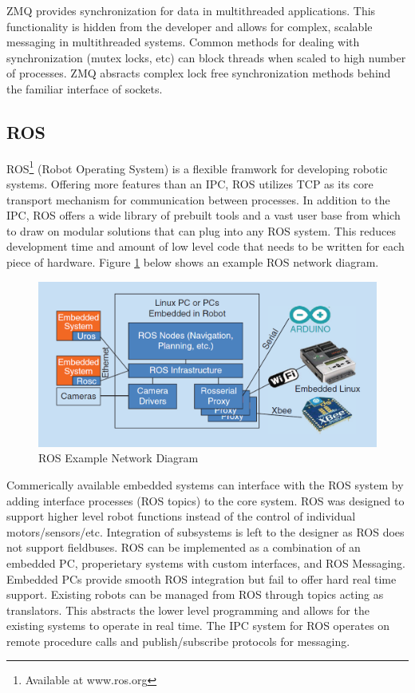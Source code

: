 ZMQ provides synchronization for data in multithreaded applications. This functionality is hidden from the developer and allows for complex, scalable messaging in multithreaded systems. Common methods for dealing with synchronization (mutex locks, etc) can block threads when scaled to high number of processes. ZMQ absracts complex lock free synchronization methods behind the familiar interface of sockets\cite{MULTITHREADZMQ}.

\subsection{ROS}

ROS\footnote{Available at www.ros.org} (Robot Operating System) is a flexible framwork for developing robotic systems. Offering more features than an IPC, ROS utilizes TCP as its core transport mechanism for communication between processes. In addition to the IPC, ROS offers a wide library of prebuilt tools and a vast user base from which to draw on modular solutions that can plug into any ROS system. This reduces development time and amount of low level code that needs to be written for each piece of hardware. Figure \ref{fig:ROS Network Diagram} below shows an example ROS network diagram.

\begin{figure}[thpb]
 \centering
 \includegraphics[width=1.0\columnwidth]{./images/rosnet.png}
  \caption{ROS Example Network Diagram}
  \label{fig:ROS Network Diagram}
\end{figure} 

Commerically available embedded systems can interface with the ROS system by adding interface processes (ROS topics) to the core system. ROS was designed to support higher level robot functions instead of the control of individual motors/sensors/etc. Integration of subsystems is left to the designer as ROS does not support fieldbuses\cite{EMBEDDEDROS}. ROS can be implemented as a combination of an embedded PC, properietary systems with custom interfaces, and ROS Messaging. Embedded PCs provide smooth ROS integration but fail to offer hard real time support. Existing robots can be managed from ROS through topics acting as translators. This abstracts the lower level programming and allows for the existing systems to operate in real time. The IPC system for ROS operates on remote procedure calls and publish/subscribe protocols for messaging. 

